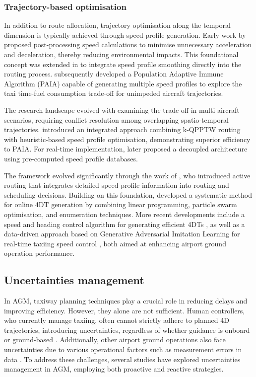 \documentclass{article}
\begin{document}
\subsubsection{Trajectory-based optimisation}

In addition to route allocation, trajectory optimisation along the temporal dimension is typically achieved through speed profile generation. Early work by \cite{atkin_airport_2010} proposed post-processing speed calculations to minimise unnecessary acceleration and deceleration, thereby reducing environmental impacts. This foundational concept was extended in \cite{lesire2010iterative} to integrate speed profile smoothing directly into the routing process. \cite{chen2011planning} subsequently developed a Population Adaptive Immune Algorithm (PAIA) capable of generating multiple speed profiles to explore the taxi time-fuel consumption trade-off for unimpeded aircraft trajectories.

The research landscape evolved with \cite{ravizza2013trade} examining the trade-off in multi-aircraft scenarios, requiring conflict resolution among overlapping spatio-temporal trajectories. \cite{weiszer2014heuristic} introduced an integrated approach combining k-QPPTW routing with heuristic-based speed profile optimisation, demonstrating superior efficiency to PAIA. For real-time implementation, \cite{weiszer2015real} later proposed a decoupled architecture using pre-computed speed profile databases.

The framework evolved significantly through the work of \cite{chen2015toward, chen2016toward}, who introduced active routing that integrates detailed speed profile information into routing and scheduling decisions. Building on this foundation, \cite{zhang2018online} developed a systematic method for online 4DT generation by combining linear programming, particle swarm optimisation, and enumeration techniques. More recent developments include a speed and heading control algorithm for generating efficient 4DTs \cite{obajemu2021real}, as well as a data-driven approach based on Generative Adversarial Imitation Learning for real-time taxiing speed control \cite{pham2021generative}, both aimed at enhancing airport ground operation performance.

\subsection{Uncertainties management}

In AGM, taxiway planning techniques play a crucial role in reducing delays and improving efficiency. However, they alone are not sufficient. Human controllers, who currently manage taxiing, often cannot strictly adhere to planned 4D trajectories, introducing uncertainties, regardless of whether guidance is onboard or ground-based \cite{okuniek2016concept}. Additionally, other airport ground operations also face uncertainties due to various operational factors such as measurement errors in data \cite{wang2022interval}. To address these challenges, several studies have explored uncertainties management in AGM, employing both proactive and reactive strategies.
\end{document}
